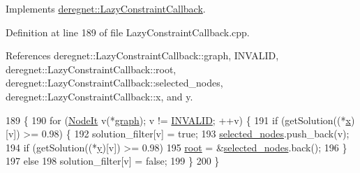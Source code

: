 Implements \hyperlink{classderegnet_1_1LazyConstraintCallback_aebc9854e98523c99d3f856ff71bb86fb}{deregnet\+::\+Lazy\+Constraint\+Callback}.



Definition at line 189 of file Lazy\+Constraint\+Callback.\+cpp.



References deregnet\+::\+Lazy\+Constraint\+Callback\+::graph, I\+N\+V\+A\+L\+ID, deregnet\+::\+Lazy\+Constraint\+Callback\+::root, deregnet\+::\+Lazy\+Constraint\+Callback\+::selected\+\_\+nodes, deregnet\+::\+Lazy\+Constraint\+Callback\+::x, and y.


\begin{DoxyCode}
189                                                                                   \{
190     \textcolor{keywordflow}{for} (\hyperlink{namespacederegnet_ac34314e1b5f456fc6d1bb9d96316de4a}{NodeIt} v(*\hyperlink{classderegnet_1_1LazyConstraintCallback_af481c9d68dea2dab035e1f2f79cda4d5}{graph}); v != \hyperlink{usinglemon_8hpp_adf770fe2eec438e3758ffe905dbae208}{INVALID}; ++v) \{
191         \textcolor{keywordflow}{if} (getSolution((*\hyperlink{classderegnet_1_1LazyConstraintCallback_a48d0e4065232a6dca6e10fe416be755f}{x})[v]) >= 0.98) \{
192             solution\_filter[v] = \textcolor{keyword}{true};
193             \hyperlink{classderegnet_1_1LazyConstraintCallback_a5ddc4662e6e5c9f1d191c15edbefaa9b}{selected\_nodes}.push\_back(v);
194             \textcolor{keywordflow}{if} (getSolution((*\hyperlink{classderegnet_1_1LazyConstraintCallbackNoRoot_aaa32cd3d5b65d1c41174cbc9a120ab64}{y})[v]) >= 0.98)
195                 \hyperlink{classderegnet_1_1LazyConstraintCallback_aa4df18debaaf3aaace54a48b0c3e56ca}{root} = &\hyperlink{classderegnet_1_1LazyConstraintCallback_a5ddc4662e6e5c9f1d191c15edbefaa9b}{selected\_nodes}.back();
196         \}
197         \textcolor{keywordflow}{else}
198             solution\_filter[v] = \textcolor{keyword}{false};
199     \}
200 \}
\end{DoxyCode}
\mbox{\label{classderegnet_1_1LazyConstraintCallbackNoRoot_a3703cd9ca73c46d70bb90f50bb2e66e5}} 
